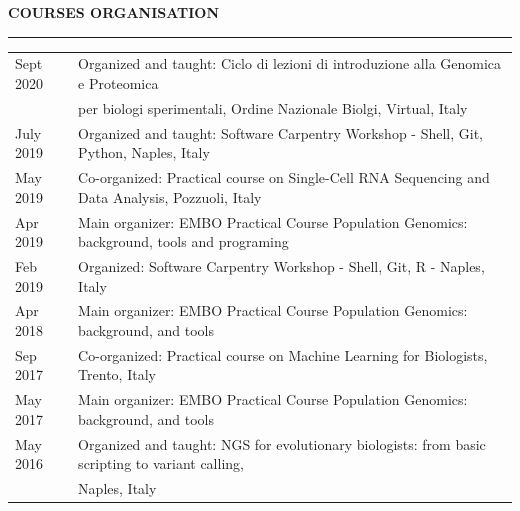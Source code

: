 \documentclass[openany]{book}
\begin{document}
\vspace{0.05cm}
\noindent
\MakeUppercase{\textbf{Courses organisation }} \vspace{0.2cm}
\sectionlineskip
\hrule
\vspace{0.2cm}
\noindent
\begin{tabular}{ l l }
Sept 2020 &  Organized and taught: Ciclo di lezioni di introduzione alla Genomica e Proteomica\\
&  per biologi sperimentali, Ordine Nazionale Biolgi, Virtual, Italy\\
July 2019 &  Organized and taught: Software Carpentry Workshop - Shell, Git, Python, Naples, Italy\\
May 2019 & Co-organized: Practical course on Single-Cell RNA Sequencing and Data Analysis, Pozzuoli, Italy\\
Apr 2019 & Main organizer: EMBO Practical Course Population Genomics: background, tools and programing\\
Feb 2019 & Organized: Software Carpentry Workshop - Shell, Git, R -  Naples, Italy\\ 
Apr 2018 & Main organizer: EMBO Practical Course Population Genomics: background, and tools\\
Sep 2017 & Co-organized: Practical course on Machine Learning for Biologists, Trento, Italy\\
May 2017 & Main organizer: EMBO Practical Course Population Genomics: background, and tools\\
May 2016 & Organized and taught: NGS for evolutionary biologists: from basic scripting to variant calling,\\ & Naples, Italy\\
\end{tabular}
\newline
\end{document}
